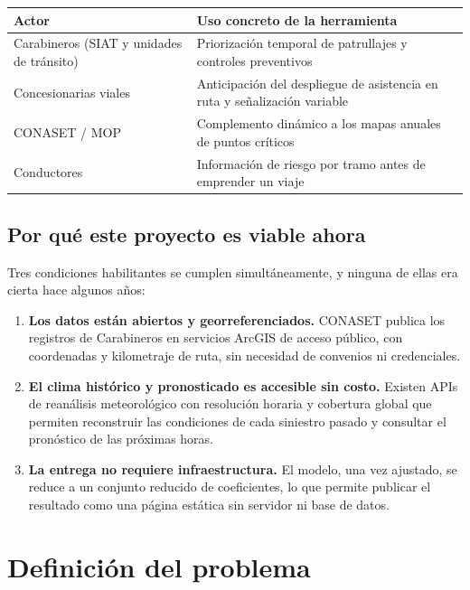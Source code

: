 \documentclass[11pt,a4paper]{article}
\begin{document}
\begin{center}
\begin{tabular}{p{}p{}}
\toprule
\textbf{Actor} & \textbf{Uso concreto de la herramienta}\\
\midrule
Carabineros (SIAT y unidades de tránsito) & Priorización temporal de patrullajes
y controles preventivos\\
\addlinespace
Concesionarias viales & Anticipación del despliegue de asistencia en ruta y
señalización variable\\
\addlinespace
CONASET / MOP & Complemento dinámico a los mapas anuales de puntos críticos\\
\addlinespace
Conductores & Información de riesgo por tramo antes de emprender un viaje\\
\bottomrule
\end{tabular}
\end{center}

\subsection{Por qué este proyecto es viable ahora}

Tres condiciones habilitantes se cumplen simultáneamente, y ninguna de ellas era
cierta hace algunos años:

\begin{enumerate}
  \item \textbf{Los datos están abiertos y georreferenciados.} CONASET publica
  los registros de Carabineros en servicios ArcGIS de acceso público, con
  coordenadas y kilometraje de ruta, sin necesidad de convenios ni credenciales.

  \item \textbf{El clima histórico y pronosticado es accesible sin costo.}
  Existen APIs de reanálisis meteorológico con resolución horaria y cobertura
  global que permiten reconstruir las condiciones de cada siniestro pasado y
  consultar el pronóstico de las próximas horas.

  \item \textbf{La entrega no requiere infraestructura.} El modelo, una vez
  ajustado, se reduce a un conjunto reducido de coeficientes, lo que permite
  publicar el resultado como una página estática sin servidor ni base de datos.
\end{enumerate}

\section{Definición del problema}
\label{sec:problema}
\end{document}
